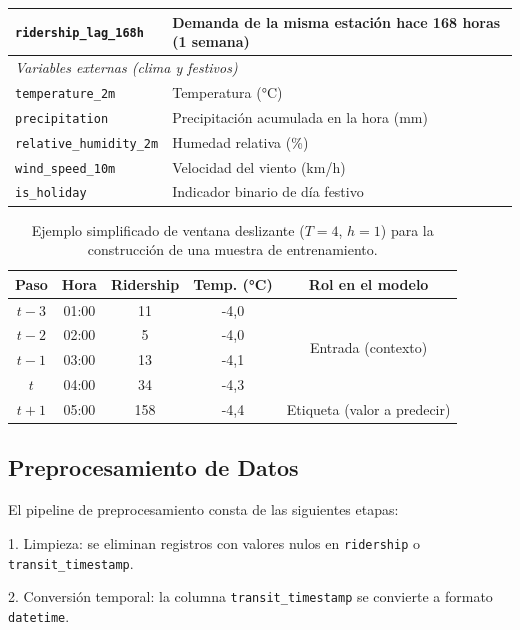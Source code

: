 \documentclass[preprint,12pt]{elsarticle}
\begin{document}
\begin{table}[htbp]
\begin{tabular}{p{4cm} p{8.5cm}}
\texttt{ridership\_lag\_168h} & Demanda de la misma estación hace 168 horas (1 semana) \\
\midrule
\multicolumn{2}{l}{\textit{Variables externas (clima y festivos)}} \\
\midrule
\texttt{temperature\_2m} & Temperatura (°C) \\
\texttt{precipitation} & Precipitación acumulada en la hora (mm) \\
\texttt{relative\_humidity\_2m} & Humedad relativa (\%) \\
\texttt{wind\_speed\_10m} & Velocidad del viento (km/h) \\
\texttt{is\_holiday} & Indicador binario de día festivo \\
\bottomrule
\end{tabular}
\end{table}



\begin{table}[htbp]
\centering
\caption{Ejemplo simplificado de ventana deslizante ($T = 4$, $h = 1$) para la construcción de una muestra de entrenamiento.}
\label{tab:ventana}
\small
\begin{tabular}{ccccc}
\toprule
\textbf{Paso} & \textbf{Hora} & \textbf{Ridership} & \textbf{Temp. (°C)} & \textbf{Rol en el modelo} \\
\midrule
$t-3$ & 01:00 & 11  & -4,0 & \multirow{4}{*}{Entrada (contexto)} \\
$t-2$ & 02:00 & 5   & -4,0 & \\
$t-1$ & 03:00 & 13  & -4,1 & \\
$t$   & 04:00 & 34  & -4,3 & \\
\midrule
$t+1$ & 05:00 & 158 & -4,4 & Etiqueta (valor a predecir) \\
\bottomrule
\end{tabular}
\end{table}


\subsection{Preprocesamiento de Datos}

El pipeline de preprocesamiento consta de las siguientes etapas:

1. Limpieza: se eliminan registros con valores nulos en \texttt{ridership} o \texttt{transit\_timestamp}. 

2. Conversión temporal: la columna \texttt{transit\_timestamp} se convierte a formato \texttt{datetime}.
\end{document}
